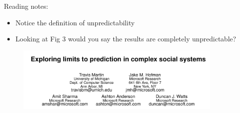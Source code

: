 \documentclass[aspectratio=169]{beamer}
\begin{document}
\begin{frame}

Reading notes:
\begin{itemize}
\item Notice the definition of unpredictability 
\pause
\item Looking at Fig 3 would you say the results are completely unpredictable?
\end{itemize}

\end{frame}
\begin{frame}

\begin{figure}
  \includegraphics[width = 0.9\textwidth]{figures/martin_exploring_2016_title}
\end{figure}

\end{frame}
\begin{frame}

\begin{center}
%
%
\end{center}

\end{frame}
\end{document}
